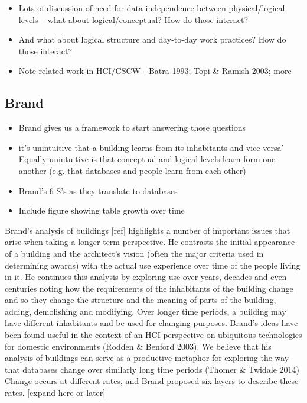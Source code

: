 \begin{itemize}
\item Lots of discussion of need for data independence between physical/logical levels – what about logical/conceptual? How do those interact?
\item And what about logical structure and day-to-day work practices? How do those interact?
\item Note related work in HCI/CSCW - Batra 1993; Topi & Ramish 2003; more
\end{itemize}

\subsection{Brand}

\begin{itemize}
\item Brand gives us a framework to start answering those questions
\item	it's unintuitive that a building learns from its inhabitants and vice versa’ Equally unintuitive is that conceptual and logical levels learn form one another (e.g. that databases and people learn from each other)
\item Brand’s 6 S’s as they translate to databases
\item Include figure showing table growth over time
\end{itemize}
Brand’s analysis of buildings [ref] highlights a number of important issues that arise when taking a longer term perspective. He contrasts the initial appearance of a building and the architect’s vision (often the major criteria used in determining awards) with the actual use experience over time of the people living in it. He continues this analysis by exploring use over years, decades and even centuries noting how the requirements of the inhabitants of the building change and so they change the structure and the meaning of parts of the building, adding, demolishing and modifying. Over longer time periods, a building may have different inhabitants and be used for changing purposes.   Brand’s ideas have been found useful in the context of an HCI perspective on ubiquitous technologies for domestic environments (Rodden & Benford 2003). We believe that his analysis of buildings can serve as a productive metaphor for exploring the way that databases change over similarly long time periods (Thomer & Twidale 2014)  
Change occurs at different rates, and Brand proposed six layers to describe these rates. [expand here or later]  
